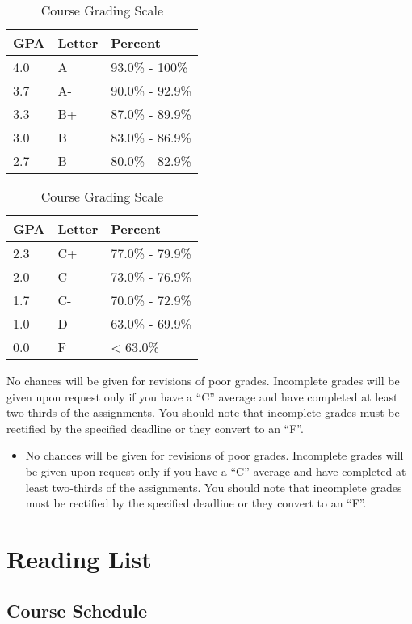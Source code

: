 \documentclass[]{book}
\newenvironment{rmdblock}[1]
  {\begin{shaded*}
  \begin{itemize}
  \renewcommand{\labelitemi}{
    \raisebox{-.7\height}[0pt][0pt]{
      {\setkeys{Gin}{width=3em,keepaspectratio}\texttt{[image: images/\#1]}}
    }
  }
  \item
  }
  {
  \end{itemize}
  \end{shaded*}
  }
\newenvironment{rmdwarning}
  {\begin{rmdblock}{warning}}
  {\end{rmdblock}}
\theoremstyle{definition}
\theoremstyle{definition}
\theoremstyle{definition}
\theoremstyle{remark}
\begin{document}
\begin{table}
\caption{\label{tab:unnamed-chunk-9}Course Grading Scale}

\centering
\begin{tabular}[t]{lll}
\toprule
GPA & Letter & Percent\\
\midrule
4.0 & A & 93.0\% - 100\%\\
3.7 & A- & 90.0\% - 92.9\%\\
3.3 & B+ & 87.0\% - 89.9\%\\
3.0 & B & 83.0\% - 86.9\%\\
2.7 & B- & 80.0\% - 82.9\%\\
\bottomrule
\end{tabular}
\centering
\begin{tabular}[t]{lll}
\toprule
GPA & Letter & Percent\\
\midrule
2.3 & C+ & 77.0\% - 79.9\%\\
2.0 & C & 73.0\% - 76.9\%\\
1.7 & C- & 70.0\% - 72.9\%\\
1.0 & D & 63.0\% - 69.9\%\\
0.0 & F & < 63.0\%\\
\bottomrule
\end{tabular}
\end{table}

No chances will be given for revisions of poor grades. Incomplete grades
will be given upon request only if you have a ``C'' average and have
completed at least two-thirds of the assignments. You should note that
incomplete grades must be rectified by the specified deadline or they
convert to an ``F''.

\begin{rmdwarning}
No chances will be given for revisions of poor grades. Incomplete grades
will be given upon request only if you have a ``C'' average and have
completed at least two-thirds of the assignments. You should note that
incomplete grades must be rectified by the specified deadline or they
convert to an ``F''.
\end{rmdwarning}

\part{Reading List}\label{part-reading-list}

\chapter{Course Schedule}\label{course-schedule}
\end{document}
